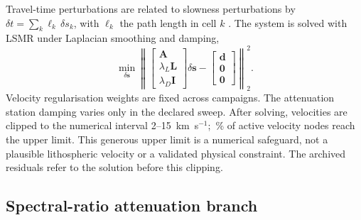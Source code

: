 \documentclass[review,authoryear,longtitle]{elsarticle}
\begin{document}
Travel-time perturbations are related to slowness perturbations by
$\delta t = \sum_k \ell_k\,\delta s_k$, with $\ell_k$ the path length in
cell $k$ \citep{Aki1976,Thurber1983,Cerveny2001}. The system is solved
with LSMR \citep{FongSaunders2011} under Laplacian smoothing and damping,
%
\begin{equation}
  \min_{\delta \mathbf{s}}
  \left\|
  \begin{bmatrix} \mathbf{A} \\ \lambda_{L}\mathbf{L} \\
                  \lambda_{D}\mathbf{I} \end{bmatrix} \delta \mathbf{s}
  -
  \begin{bmatrix} \mathbf{d} \\ \mathbf{0} \\ \mathbf{0} \end{bmatrix}
  \right\|_{2}^{2} .
  \label{eq:vp}
\end{equation}
%
Velocity regularisation weights are fixed across campaigns. The
attenuation station damping varies only in the declared sweep.
After solving, velocities are clipped to the numerical interval
2--15~km~s$^{-1}$; \fracVpTecho\,\% of active velocity nodes reach the
upper limit. This generous upper limit is a numerical safeguard, not a
plausible lithospheric velocity or a validated physical constraint.
The archived residuals refer to the solution before this clipping.

\subsection{Spectral-ratio attenuation branch}
\end{document}
